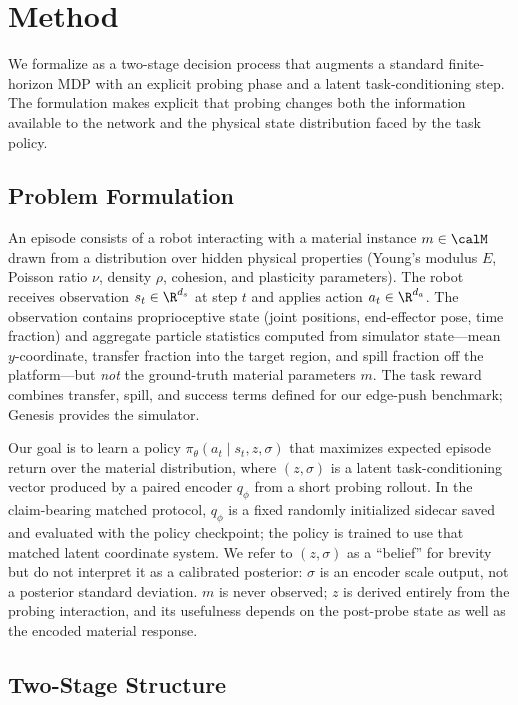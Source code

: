 \section{Method}
\label{sec:method}

We formalize \PTA{} as a two-stage decision process that augments a standard finite-horizon MDP with an explicit probing phase and a latent task-conditioning step. The formulation makes explicit that probing changes both the information available to the network and the physical state distribution faced by the task policy.

\subsection{Problem Formulation}

An episode consists of a robot interacting with a material instance $m \in \calM$ drawn from a distribution over hidden physical properties (Young's modulus $E$, Poisson ratio $\nu$, density $\rho$, cohesion, and plasticity parameters). The robot receives observation $s_t \in \R^{d_s}$ at step $t$ and applies action $a_t \in \R^{d_a}$. The observation contains proprioceptive state (joint positions, end-effector pose, time fraction) and aggregate particle statistics computed from simulator state---mean $y$-coordinate, transfer fraction into the target region, and spill fraction off the platform---but \emph{not} the ground-truth material parameters $m$. The task reward combines transfer, spill, and success terms defined for our edge-push benchmark; Genesis provides the simulator.

Our goal is to learn a policy $\pi_\theta(a_t \mid s_t, z, \sigma)$ that maximizes expected episode return over the material distribution, where $(z, \sigma)$ is a latent task-conditioning vector produced by a paired encoder $q_\phi$ from a short probing rollout. In the claim-bearing matched protocol, $q_\phi$ is a fixed randomly initialized sidecar saved and evaluated with the policy checkpoint; the policy is trained to use that matched latent coordinate system. We refer to $(z, \sigma)$ as a ``belief'' for brevity but do not interpret it as a calibrated posterior: $\sigma$ is an encoder scale output, not a posterior standard deviation. $m$ is never observed; $z$ is derived entirely from the probing interaction, and its usefulness depends on the post-probe state as well as the encoded material response.

\subsection{Two-Stage Structure}

